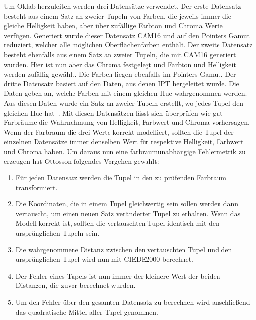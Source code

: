 \documentclass[12pt, a4paper, ngerman]{article}
\begin{document}
Um Oklab herzuleiten werden drei Datensätze verwendet. 
Der erste Datensatz besteht aus einem Satz an zweier Tupeln von Farben, die jeweils immer die gleiche Helligkeit haben, aber über zufällige Farbton und Chroma Werte verfügen.
Generiert wurde dieser Datensatz CAM16 und auf den Pointers Gamut reduziert, welcher alle möglichen Oberflächenfarben enthält.
Der zweite Datensatz besteht ebenfalls aus einem Satz an zweier Tupeln, die mit CAM16 generiert wurden. 
Hier ist nun aber das Chroma festgelegt und Farbton und Helligkeit werden zufällig gewählt. Die Farben liegen ebenfalls im Pointers Gamut.
Der dritte Datensatz basiert auf den Daten, aus denen IPT hergeleitet wurde. Die Daten geben an, welche Farben mit einem gleichen Hue wahrgenommen werden. 
Aus diesen Daten wurde ein Satz an zweier Tupeln erstellt, wo jedes Tupel den gleichen Hue hat~\cite{Oklab_2020}.
Mit diesen Datensätzen lässt sich überprüfen wie gut Farbräume die Wahrnehmung von Helligkeit, Farbwert und Chroma vorhersagen. 
Wenn der Farbraum die drei Werte korrekt modelliert, sollten die Tupel der einzelnen Datensätze immer denselben Wert für respektive Helligkeit, Farbwert und Chroma haben.
Um daraus nun eine farbraumunabhängige Fehlermetrik zu erzeugen hat Ottosson folgendes Vorgehen gewählt:
\begin{enumerate}
  \item Für jeden Datensatz werden die Tupel in den zu prüfenden Farbraum transformiert.
  \item Die Koordinaten, die in einem Tupel gleichwertig sein sollen werden dann vertauscht, um einen neuen Satz veränderter Tupel zu erhalten. Wenn das Modell korrekt ist, sollten die vertauschten Tupel identisch mit den ursprünglichen Tupeln sein. 
  \item Die wahrgenommene Distanz zwischen den vertauschten Tupel und den ursprünglichen Tupel wird nun mit CIEDE2000 berechnet. 
  \item Der Fehler eines Tupels ist nun immer der kleinere Wert der beiden Distanzen, die zuvor berechnet wurden.
  \item Um den Fehler über den gesamten Datensatz zu berechnen wird anschließend das quadratische Mittel aller Tupel genommen.
\end{enumerate}
\end{document}
